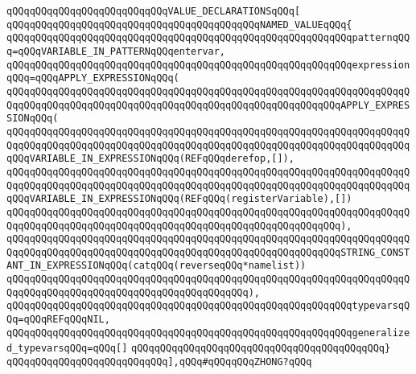 \verb|qQQqqQQqqQQqqQQqqQQqqQQqqQQqVALUE_DECLARATIONSqQQq[|\newline
\newline
\verb|qQQqqQQqqQQqqQQqqQQqqQQqqQQqqQQqqQQqqQQqqQQqNAMED_VALUEqQQq{|\newline
\newline
\verb|qQQqqQQqqQQqqQQqqQQqqQQqqQQqqQQqqQQqqQQqqQQqqQQqqQQqqQQqqQQqpatternqQQq=qQQqVARIABLE_IN_PATTERNqQQqentervar,|\newline
\newline
\verb|qQQqqQQqqQQqqQQqqQQqqQQqqQQqqQQqqQQqqQQqqQQqqQQqqQQqqQQqqQQqexpressionqQQq=qQQqAPPLY_EXPRESSIONqQQq(|\newline
\verb|qQQqqQQqqQQqqQQqqQQqqQQqqQQqqQQqqQQqqQQqqQQqqQQqqQQqqQQqqQQqqQQqqQQqqQQqqQQqqQQqqQQqqQQqqQQqqQQqqQQqqQQqqQQqqQQqqQQqqQQqqQQqqQQqAPPLY_EXPRESSIONqQQq(|\newline
\verb|qQQqqQQqqQQqqQQqqQQqqQQqqQQqqQQqqQQqqQQqqQQqqQQqqQQqqQQqqQQqqQQqqQQqqQQqqQQqqQQqqQQqqQQqqQQqqQQqqQQqqQQqqQQqqQQqqQQqqQQqqQQqqQQqqQQqqQQqqQQqqQQqVARIABLE_IN_EXPRESSIONqQQq(REFqQQqderefop,[]),|\newline
\verb|qQQqqQQqqQQqqQQqqQQqqQQqqQQqqQQqqQQqqQQqqQQqqQQqqQQqqQQqqQQqqQQqqQQqqQQqqQQqqQQqqQQqqQQqqQQqqQQqqQQqqQQqqQQqqQQqqQQqqQQqqQQqqQQqqQQqqQQqqQQqqQQqVARIABLE_IN_EXPRESSIONqQQq(REFqQQq(registerVariable),[])|\newline
\verb|qQQqqQQqqQQqqQQqqQQqqQQqqQQqqQQqqQQqqQQqqQQqqQQqqQQqqQQqqQQqqQQqqQQqqQQqqQQqqQQqqQQqqQQqqQQqqQQqqQQqqQQqqQQqqQQqqQQqqQQqqQQqqQQq),|\newline
\verb|qQQqqQQqqQQqqQQqqQQqqQQqqQQqqQQqqQQqqQQqqQQqqQQqqQQqqQQqqQQqqQQqqQQqqQQqqQQqqQQqqQQqqQQqqQQqqQQqqQQqqQQqqQQqqQQqqQQqqQQqqQQqqQQqSTRING_CONSTANT_IN_EXPRESSIONqQQq(catqQQq(reverseqQQq*namelist))|\newline
\verb|qQQqqQQqqQQqqQQqqQQqqQQqqQQqqQQqqQQqqQQqqQQqqQQqqQQqqQQqqQQqqQQqqQQqqQQqqQQqqQQqqQQqqQQqqQQqqQQqqQQqqQQqqQQqqQQq),|\newline
\newline
\verb|qQQqqQQqqQQqqQQqqQQqqQQqqQQqqQQqqQQqqQQqqQQqqQQqqQQqqQQqqQQqtypevarsqQQq=qQQqREFqQQqNIL,|\newline
\verb|qQQqqQQqqQQqqQQqqQQqqQQqqQQqqQQqqQQqqQQqqQQqqQQqqQQqqQQqqQQqgeneralized_typevarsqQQq=qQQq[]|\newline
\verb|qQQqqQQqqQQqqQQqqQQqqQQqqQQqqQQqqQQqqQQqqQQq}|\newline
\verb|qQQqqQQqqQQqqQQqqQQqqQQqqQQq],qQQq#qQQqqQQqZHONG?qQQq|\newline
\newline
